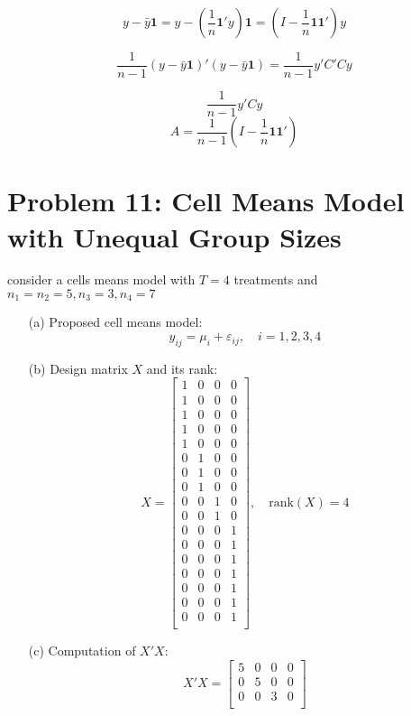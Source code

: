 \documentclass[10pt, oneside]{article}
\begin{document}
\[
y - \bar{y}\mathbf{1} = y - \left( \frac{1}{n} \mathbf{1}'y \right)\mathbf{1} = \left( I - \frac{1}{n} \mathbf{1}\mathbf{1}' \right)y
\]

\[
\frac{1}{n-1} (y - \bar{y}\mathbf{1})'(y - \bar{y}\mathbf{1}) = \frac{1}{n-1} y' C'C y
\]

\[
\frac{1}{n-1} y' C y
\]
\[
A = \frac{1}{n-1} \left( I - \frac{1}{n} \mathbf{1}\mathbf{1}' \right)
\]

\section*{Problem 11: Cell Means Model with Unequal Group Sizes}
consider a cells means model with $T=4$ treatments and $n_1=n_2=5,n_3=3,n_4=7$ 
\begin{itemize}
	\item[(a)] Proposed cell means model:
      \[
    y_{ij} = \mu_i + \varepsilon_{ij}, \quad i = 1, 2, 3, 4
  \]
	\item[(b)] Design matrix $X$ and its rank:
      \[
    X = \begin{bmatrix}
      1 & 0 & 0 & 0 \\
      1 & 0 & 0 & 0 \\
      1 & 0 & 0 & 0 \\
      1 & 0 & 0 & 0 \\
      1 & 0 & 0 & 0 \\
      0 & 1 & 0 & 0 \\
      0 & 1 & 0 & 0 \\
      0 & 1 & 0 & 0 \\
      0 & 0 & 1 & 0 \\
      0 & 0 & 1 & 0 \\
      0 & 0 & 0 & 1 \\
      0 & 0 & 0 & 1 \\
      0 & 0 & 0 & 1 \\
      0 & 0 & 0 & 1 \\
      0 & 0 & 0 & 1 \\
      0 & 0 & 0 & 1 \\
      0 & 0 & 0 & 1 \\
    \end{bmatrix}, \quad \text{rank}(X) = 4
  \]
	\item[(c)] Computation of $X'X$:
      \[
    X'X = \begin{bmatrix}
      5 & 0 & 0 & 0 \\
      0 & 5 & 0 & 0 \\
      0 & 0 & 3 & 0 \\

\end{bmatrix}\]
\end{itemize}
\end{document}
